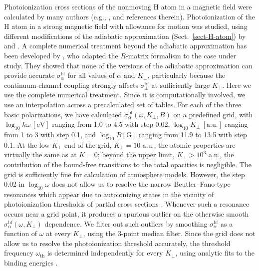 \documentclass{emulateapj}
\begin{document}
Photoionization cross sections of the nonmoving H atom in 
a magnetic field were calculated by many authors (e.g.,
\citealp*{PPV},
and references therein).
Photoionization of the H atom in a strong magnetic field
with allowance for motion was studied, using different modifications  
of the adiabatic approximation (Sect.\ \ref{sect-H-atom})
by \citet{BP94}
and 
\citet*{KVH}.
A complete numerical treatment beyond the adiabatic approximation
has been developed by \citet{PP97},
who adapted the $R$-matrix formalism 
\citep{Rmatrix} 
 to the case under study.
They showed that none of the versions of the adiabatic approximation
can provide accurate $\sigma_\alpha^\mathrm{bf}$ for all
values of $\alpha$ and $K_\perp$, particularly because the
continuum-channel coupling strongly affects $\sigma_\pm^\mathrm{bf}$
at sufficiently large $K_\perp$.
Here we use the complete numerical treatment.
Since it is computationally involved,
we use an interpolation across a precalculated set of tables.
For each of the three basic polarizations, we have calculated 
$\sigma_\alpha^\mathrm{bf}(\omega,K_\perp,B)$ on a predefined grid,
with 
$\log_{10}\hbar\omega\ [\mathrm{eV}]$ ranging from 1.0 to 4.5
with step 0.02, $\log_{10}K_\perp\ [\mathrm{a.u.}]$
ranging from 1 to 3 with step 0.1,
and $\log_{10}B[\mathrm{G}]$
ranging from 11.9 to 13.5 with step 0.1.
At the low-$K_\perp$ end of the grid, $K_\perp=10$ a.u.,
the atomic properties are virtually the same as at $K=0$;
beyond the upper limit, $K_\perp>10^3$ a.u., the contribution
of the bound-free transitions to the total opacities is negligible.
The grid is sufficiently fine for calculation of atmosphere models.
However, the step 0.02 in $\log_{10}\omega$
 does not allow us to resolve the narrow Beutler--Fano-type 
resonances
which appear due to autoionizing states in the vicinity of photoionization thresholds
of partial cross sections
\citep{PPV,PP97}. 
Whenever such a resonance occurs near a grid point,
it produces a spurious outlier on the otherwise smooth
$\sigma_\alpha^\mathrm{bf}(\omega,K_\perp)$ dependence.
We filter out such outliers by smoothing $\sigma_\alpha^\mathrm{bf}$
as a function of $\omega$ at every $K_\perp$,
using the 3-point median filter.
Since the grid does not allow us to resolve
the photoionization threshold accurately, the threshold frequency 
$\omega_\mathrm{th}$
is determined independently for every
$K_\perp$, using analytic
 fits to the binding energies \citep{P98}.
\end{document}
